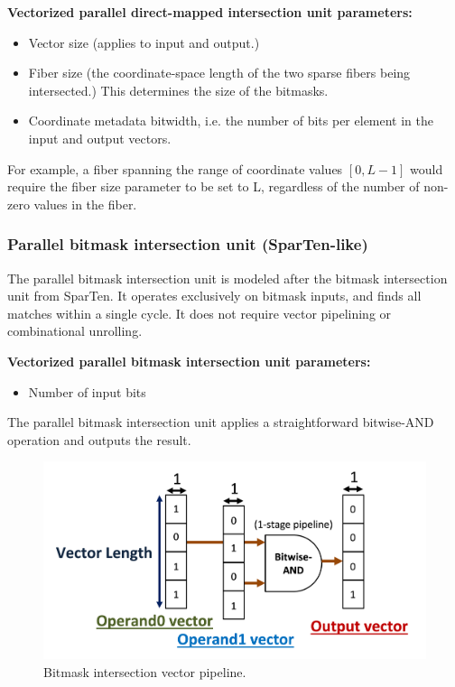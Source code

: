 \textbf{Vectorized parallel direct-mapped intersection unit parameters:}

\begin{itemize}
    \item Vector size (applies to input and output.)
    \item Fiber size (the coordinate-space length of the two sparse fibers being intersected.) This determines the size of the bitmasks.
    \item Coordinate metadata bitwidth, i.e. the number of bits per element in the input and output vectors.
\end{itemize}

For example, a fiber spanning the range of coordinate values $[0,L-1]$ would require the fiber size parameter to be set to L, regardless of the number of non-zero values in the fiber.



\subsubsection{Parallel bitmask intersection unit (SparTen\cite{sparten}-like)}

The parallel bitmask intersection unit is modeled after the bitmask intersection unit from SparTen\cite{sparten}. It operates exclusively on bitmask inputs, and finds all matches within a single cycle. It does not require vector pipelining or combinational unrolling.

\textbf{Vectorized parallel bitmask intersection unit parameters:}

\begin{itemize}
    \item Number of input bits
\end{itemize}

The parallel bitmask intersection unit applies a straightforward bitwise-AND operation and outputs the result.

\begin{figure}[H]
    \centering
    \includegraphics[width=\linewidth]{figures/bitmask_intersection.png}
    \caption{Bitmask intersection vector pipeline.}
    \label{fig:bitmask_intersection}
\end{figure}